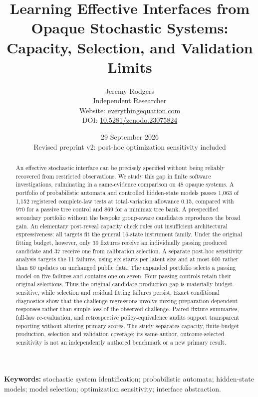 


\title{Learning Effective Interfaces from Opaque Stochastic Systems:\\Capacity, Selection, and Validation Limits}
\author{Jeremy Rodgers\\\small Independent Researcher\\\small Website: \href{https://www.everythingequation.com}{everythingequation.com}\\\small DOI: \href{https://doi.org/10.5281/zenodo.23075824}{10.5281/zenodo.23075824}}
\date{29 September 2026\\\small Revised preprint v2: post-hoc optimization sensitivity included}
\maketitle
\begin{abstract}
An effective stochastic interface can be precisely specified without being reliably recovered from restricted observations. We study this gap in finite software investigations, culminating in a same-evidence comparison on 48 opaque systems. A portfolio of probabilistic automata and controlled hidden-state models passes 1,063 of 1,152 registered complete-law tests at total-variation allowance 0.15, compared with 970 for a passive tree control and 869 for a minimax tree bank. A prespecified secondary portfolio without the bespoke group-aware candidates reproduces the broad gain. An elementary post-reveal capacity check rules out insufficient architectural expressiveness: all targets fit the general 16-state instrument family. Under the original fitting budget, however, only 39 fixtures receive an individually passing produced candidate and 37 receive one from calibration selection. A separate post-hoc sensitivity analysis targets the 11 failures, using six starts per latent size and at most 600 rather than 60 updates on unchanged public data. The expanded portfolio selects a passing model on five failures and contains one on seven. Four passing controls retain their original selections. Thus the original candidate-production gap is materially budget-sensitive, while selection and residual fitting failures persist. Exact conditional diagnostics show that the challenge regressions involve mixing preparation-dependent responses rather than simple loss of the observed challenge. Paired fixture summaries, full-law re-evaluation, and retrospective policy-equivalence audits support transparent reporting without altering primary scores. The study separates capacity, finite-budget production, selection and validation coverage; its same-author, outcome-selected sensitivity is not an independently authored benchmark or a new primary result.
\end{abstract}
\noindent\textbf{Keywords:} stochastic system identification; probabilistic automata; hidden-state models; model selection; optimization sensitivity; interface abstraction.

